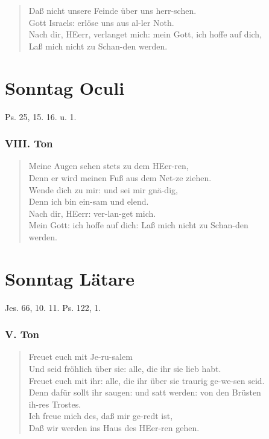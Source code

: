 \begin{verse}
Daß nicht unsere Feinde über uns herr-schen.\\
Gott Israels: erlöse uns aus al-ler Noth.\\
Nach dir, HEerr, verlanget mich: mein Gott, ich hoffe auf dich,\\
Laß mich nicht zu Schan-den werden.
\end{verse}

\section{Sonntag Oculi}

Ps. 25, 15. 16. u. 1.

\subsubsection{VIII. Ton}
\begin{verse}
Meine Augen sehen stets zu dem HEer-ren,\\
Denn er wird meinen Fuß aus dem Net-ze ziehen.\\
Wende dich zu mir: und sei mir gnä-dig,\\
Denn ich bin ein-sam und elend.\\
Nach dir, HEerr: ver-lan-get mich.\\
Mein Gott: ich hoffe auf dich: Laß mich nicht zu Schan-den\\
werden.
\end{verse}

\section{Sonntag Lätare}

Jes. 66, 10. 11. Ps. 122, 1.

\subsubsection{V. Ton}
\begin{verse}
Freuet euch mit Je-ru-salem\\
Und seid fröhlich über sie: alle, die ihr sie lieb habt.\\
Freuet euch mit ihr: alle, die ihr über sie traurig ge-we-sen seid.\\
Denn dafür sollt ihr saugen: und satt werden: von den Brüsten\\
ih-res Trostes.\\
Ich freue mich des, daß mir ge-redt ist,\\
Daß wir werden ins Haus des HEer-ren gehen.
\end{verse}

